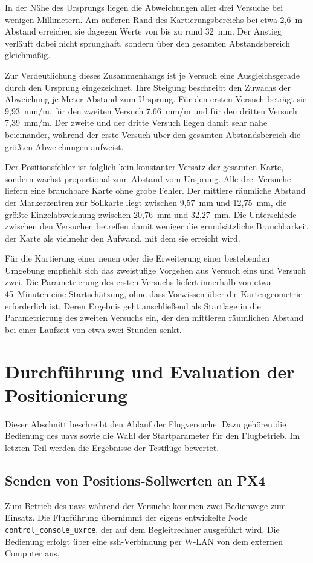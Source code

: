In der Nähe des Ursprungs liegen die Abweichungen aller drei Versuche bei wenigen Millimetern.
Am äußeren Rand des Kartierungsbereichs bei etwa 2,6~m Abstand erreichen sie dagegen Werte von bis zu rund 32~mm.
Der Anstieg verläuft dabei nicht sprunghaft, sondern über den gesamten Abstandsbereich gleichmäßig.

Zur Verdeutlichung dieses Zusammenhangs ist je Versuch eine Ausgleichsgerade durch den Ursprung eingezeichnet.
Ihre Steigung beschreibt den Zuwachs der Abweichung je Meter Abstand zum Ursprung.
Für den ersten Versuch beträgt sie 9,93~mm/m, für den zweiten Versuch 7,66~mm/m und für den dritten Versuch 7,39~mm/m.
Der zweite und der dritte Versuch liegen damit sehr nahe beieinander, während der erste Versuch über den gesamten Abstandsbereich die größten Abweichungen aufweist.

Der Positionsfehler ist folglich kein konstanter Versatz der gesamten Karte, sondern wächst proportional zum Abstand vom Ursprung.
Alle drei Versuche liefern eine brauchbare Karte ohne grobe Fehler.
Der mittlere räumliche Abstand der Markerzentren zur Sollkarte liegt zwischen 9,57~mm und 12,75~mm, die größte Einzelabweichung zwischen 20,76~mm und 32,27~mm.
Die Unterschiede zwischen den Versuchen betreffen damit weniger die grundsätzliche Brauchbarkeit der Karte als vielmehr den Aufwand, mit dem sie erreicht wird.

Für die Kartierung einer neuen oder die Erweiterung einer bestehenden Umgebung empfiehlt sich das zweistufige Vorgehen aus Versuch eins und Versuch zwei.
Die Parametrierung des ersten Versuchs liefert innerhalb von etwa 45~Minuten eine Startschätzung, ohne dass Vorwissen über die Kartengeometrie erforderlich ist.
Deren Ergebnis geht anschließend als Startlage in die Parametrierung des zweiten Versuchs ein, der den mittleren räumlichen Abstand bei einer Laufzeit von etwa zwei Stunden senkt.





\section{Durchführung und Evaluation der Positionierung}
\label{sec:durchfuehrung_positionierung}
Dieser Abschnitt beschreibt den Ablauf der Flugversuche.
Dazu gehören die Bedienung des \gls{uav}s sowie die Wahl der Startparameter für den Flugbetrieb.
Im letzten Teil werden die Ergebnisse der Testflüge bewertet.

\subsection{Senden von Positions-Sollwerten an PX4}
\label{sec:bedienkonsole}
Zum Betrieb des \gls{uav}s während der Versuche kommen zwei Bedienwege zum Einsatz.
Die Flugführung übernimmt der eigens entwickelte Node \texttt{control\_console\_uxrce}, der auf dem Begleitrechner ausgeführt wird.
Die Bedienung erfolgt über eine \gls{ssh}-Verbindung per W-LAN von dem externen Computer aus. 


